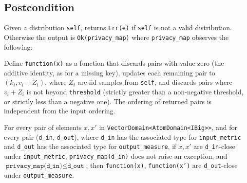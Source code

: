 \documentclass{article}
\begin{document}
\subsection*{Postcondition}
\begin{theorem}
    Given a distribution \texttt{self},
    returns \texttt{Err(e)} if \texttt{self} is not a valid distribution.
    Otherwise the output is \texttt{Ok(privacy\_map)}
    where \texttt{privacy\_map} observes the following:

    Define \texttt{function(x)} as a function that discards pairs with value zero (the additive identity, as for a missing key),
    updates each remaining pair to $(k_i, v_i + Z_i)$,
    where $Z_i$ are iid samples from \texttt{self},
    and discards pairs where $v_i + Z_i$ is not beyond \texttt{threshold}
    (strictly greater than a non-negative threshold, or strictly less than a negative one).
    The ordering of returned pairs is independent from the input ordering.

    For every pair of elements $x, x'$ in \texttt{VectorDomain<AtomDomain<IBig>{}>},
    and for every pair (\texttt{d\_in}, \texttt{d\_out}),
    where \texttt{d\_in} has the associated type for \texttt{input\_metric} and \texttt{d\_out} has the associated type for \texttt{output\_measure},
    if $x, x'$ are \texttt{d\_in}-close under \texttt{input\_metric}, \texttt{privacy\_map(d\_in)} does not raise an exception,
    and $\texttt{privacy\_map(d\_in)} \leq \texttt{d\_out}$,
    then \texttt{function(x)}, \texttt{function(x')} are \texttt{d\_out}-close under \texttt{output\_measure}.
\end{theorem}
\end{document}

